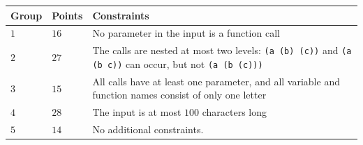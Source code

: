 \noindent
\begin{tabular}{| l | l | p{12cm} |}
  \hline
  \textbf{Group} & \textbf{Points} & \textbf{Constraints} \\ \hline
  $1$    & $16$      & No parameter in the input is a function call \\ \hline
  $2$    & $27$      & The calls are nested at most two levels: \texttt{(a (b) (c))} and \texttt{(a (b c))} can occur, but not \texttt{(a (b (c)))} \\ \hline
  $3$    & $15$      & All calls have at least one parameter, and all variable and function names consist of only one letter \\ \hline
  $4$    & $28$      & The input is at most $100$ characters long \\ \hline
  $5$    & $14$      & No additional constraints.  \\ \hline
\end{tabular}
